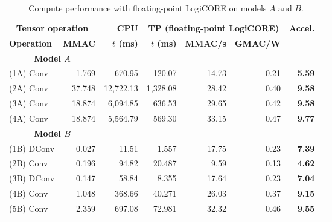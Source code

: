 \begin{table}[!htp]\centering
	\caption{Compute performance with floating-point LogiCORE on models $A$ and $B$.}\label{tab:performace_float_logicore}
	\scriptsize
	\begin{tabular}{lrrrrrrr}\toprule
		\multicolumn{2}{c}{\textbf{Tensor operation}} &\textbf{CPU} &\multicolumn{3}{c}{\textbf{TP (floating-point LogiCORE)}} &\multirow{2}{*}{\textbf{Accel.}} \\\cmidrule{1-6}
		\textbf{Operation} &\textbf{MMAC} &\textbf{$t$ (ms)} &\textbf{$t$ (ms)} &\textbf{MMAC/s} &\textbf{GMAC/W} & \\\midrule
		\multicolumn{2}{c}{\textbf{Model $A$}} & & & & & \\
		(1A) Conv &1.769 &670.95 &120.07 &14.73 &0.21 &\textbf{5.59} \\
		(2A) Conv &37.748 &12,722.13 &1,328.08 &28.42 &0.40 &\textbf{9.58} \\
		(3A) Conv &18.874 &6,094.85 &636.53 &29.65 &0.42 &\textbf{9.58} \\
		(4A) Conv &18.874 &5,564.79 &569.30 &33.15 &0.47 &\textbf{9.77} & \\\midrule
		\multicolumn{2}{c}{\textbf{Model $B$}} & & & & & \\
		(1B) DConv &0.027 &11.51 &1.557 &17.75 &0.23 &\textbf{7.39} \\
		(2B) Conv &0.196 &94.82 &20.487 &9.59 &0.13 &\textbf{4.62} \\
		(3B) DConv &0.147 &58.84 &8.355 &17.64 &0.23 &\textbf{7.04} \\
		(4B) Conv &1.048 &368.66 &40.271 &26.03 &0.37 &\textbf{9.15} \\
		(5B) Conv &2.359 &697.08 &72.981 &32.32 &0.46 &\textbf{9.55} \\
		\bottomrule
	\end{tabular}
\end{table}

